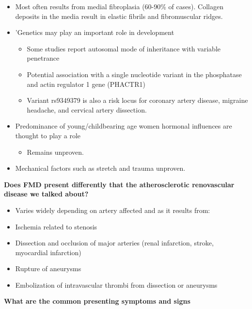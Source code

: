 \documentclass[
]{book}
\providecommand{\tightlist}{%
  \setlength{\itemsep}{0pt}\setlength{\parskip}{0pt}}
\begin{document}
\begin{itemize}
\item
  Most often results from medial fibroplasia (60-90\% of cases).
  Collagen deposits in the media result in elastic fibrils and
  fibromuscular ridges. \citep{olinFibromuscularDysplasiaState2014}
\item
  'Genetics may play an important role in development

  \begin{itemize}
  \item
    Some studies report autosomal mode of inheritance with variable
    penetrance
  \item
    Potential association with a single nucleotide variant in the
    phosphatase and actin regulator 1 gene (PHACTR1)
  \item
    Variant rs9349379 is also a risk locus for coronary artery
    disease, migraine headache, and cervical artery dissection.
  \end{itemize}
\item
  Predominance of young/childbearing age women hormonal influences are
  thought to play a role

  \begin{itemize}
  \tightlist
  \item
    Remains unproven.
  \end{itemize}
\item
  Mechanical factors such as stretch and trauma unproven.
\end{itemize}

\textbf{Does FMD present differently that the atherosclerotic renovascular
disease we talked about?}

\begin{itemize}
\item
  Varies widely depending on artery affected and as it results from:
\item
  Ischemia related to stenosis
\item
  Dissection and occlusion of major arteries (renal infarction,
  stroke, myocardial infarction)
\item
  Rupture of aneurysms
\item
  Embolization of intravascular thrombi from dissection or aneurysms
\end{itemize}

\textbf{What are the common presenting symptoms and signs}
\end{document}
